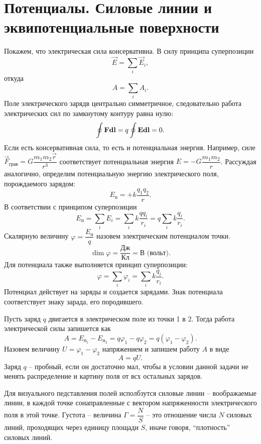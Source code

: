 \section{Потенциалы. Силовые линии и эквипотенциальные поверхности}

	Покажем, что электрическая сила консервативна. В силу принципа суперпозиции
		$$\vec{E}=\sum_i \vec{E}_i,$$
	откуда
		$$A=\sum_i A_i.$$
	Поле электрического зарядв центрально симметричное, следовательно работа электрических сил по замкнутому контуру равна нулю:
		$$\oint \text{\textbf{F}}\textbf{d}\text{\textbf{l}}=q\oint \text{\textbf{E}}\textbf{d}\text{\textbf{l}}=0.$$
	Если есть консервативная сила, то есть и потенциальная энергия. Например, силе $\vec{F}_{\text{грав}}=G\dfrac{m_1m_2\vec{r}}{r^3}$ соответствует потенциальная энергия $E=-G\dfrac{m_1m_2}{r}$. Рассуждая аналогично, определим потенциальную энергию электрического поля, порождаемого зарядом:
		$$E_{\text{п}}=+k\frac{q_1q_2}{r}.$$
	В соответствии с принципом суперпозиции
		$$E_{\text{п}}=\sum_i E_i=\sum_i k\frac{qq_i}{r_i}=q\sum_i k\frac{q_i}{r_i}.$$
	Скалярную величину $\varphi=\dfrac{E_{\text{п}}}{q}$ назовем электрическим потенциалом точки.
		$$\dim{\varphi}=\frac{\text{Дж}}{\text{Кл}}=\text{В (вольт)}.$$
	Для потенциала также выполняется принцип суперпозиции:
		$$\varphi=\sum_i \varphi_i=\sum_i k\frac{q_i}{r_i}.$$
	Потенциал действует на заряды и создается зарядами. Знак потенциала соответствует знаку зарада, его породившего. \par
	Пусть заряд $q$ двигается в электрическом поле из точки 1 в 2. Тогда работа электрической силы запишется как
		$$A=E_{\text{п}_{\text{1}}}-E_{\text{п}_{\text{2}}}=q\varphi_1-q\varphi_2=q(\varphi_1-\varphi_2).$$
	Назовем величину $U=\varphi_1-\varphi_2$ напряжением и запишем работу $A$ в виде 
		$$A=qU.$$
	Заряд $q$ -- пробный, если он достаточно мал, чтобы в условии данной задачи не менять распределение и картину поля от всх остальных зарядов.\par
	Для визуального педставления полей исполбзутся силовые линии -- воображаемые линии, в каждой точке сонаправленные с вектором напряженности электрического поля в этой точке. Густота -- величина $\Gamma=\dfrac{N}{S}$ -- это отношение числа $N$ силовых линий, проходящих через единицу площади $S$, иначе говоря, ``плотность'' силовых линий. 